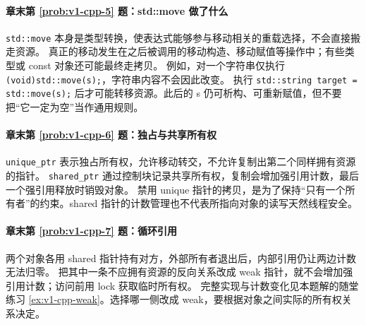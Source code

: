 \paragraph*{章末第 \ref{prob:v1-cpp-5} 题：std::move 做了什么}
\begin{solution}
\texttt{std::move} 本身是类型转换，使表达式能够参与移动相关的重载选择，不会直接搬走资源。
真正的移动发生在之后被调用的移动构造、移动赋值等操作中；有些类型或 const 对象还可能最终走拷贝。
例如，对一个字符串仅执行 \texttt{(void)std::move(s);}，字符串内容不会因此改变。
执行 \texttt{std::string target = std::move(s);} 后才可能转移资源。此后的 s 仍可析构、可重新赋值，但不要把“它一定为空”当作通用规则。
\end{solution}

\paragraph*{章末第 \ref{prob:v1-cpp-6} 题：独占与共享所有权}
\begin{solution}
\texttt{unique\_ptr} 表示独占所有权，允许移动转交，不允许复制出第二个同样拥有资源的指针。
\texttt{shared\_ptr} 通过控制块记录共享所有权，复制会增加强引用计数，最后一个强引用释放时销毁对象。
禁用 unique 指针的拷贝，是为了保持“只有一个所有者”的约束。shared 指针的计数管理也不代表所指向对象的读写天然线程安全。
\end{solution}

\paragraph*{章末第 \ref{prob:v1-cpp-7} 题：循环引用}
\begin{solution}
两个对象各用 shared 指针持有对方，外部所有者退出后，内部引用仍让两边计数无法归零。
把其中一条不应拥有资源的反向关系改成 weak 指针，就不会增加强引用计数；访问前用 lock 获取临时所有权。
完整实现与计数变化见本题解的随堂练习 \ref{ex:v1-cpp-weak}。选择哪一侧改成 weak，要根据对象之间实际的所有权关系决定。
\end{solution}

